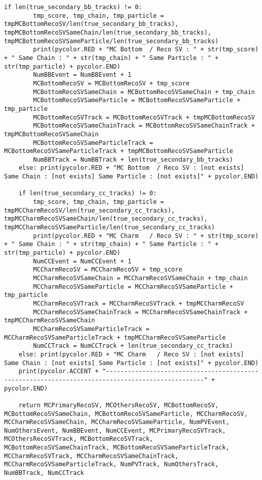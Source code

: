 \begin{lstlisting}[caption=崩壊点検出アルゴリズム用関数,label=VertexFinder1]
    if len(true_secondary_bb_tracks) != 0:
        tmp_score, tmp_chain, tmp_particle = tmpMCBottomRecoSV/len(true_secondary_bb_tracks), tmpMCBottomRecoSVSameChain/len(true_secondary_bb_tracks), tmpMCBottomRecoSVSameParticle/len(true_secondary_bb_tracks)
        print(pycolor.RED + "MC Bottom  / Reco SV : " + str(tmp_score) + " Same Chain : " + str(tmp_chain) + " Same Particle : " + str(tmp_particle) + pycolor.END)
        NumBBEvent = NumBBEvent + 1
        MCBottomRecoSV = MCBottomRecoSV + tmp_score
        MCBottomRecoSVSameChain = MCBottomRecoSVSameChain + tmp_chain
        MCBottomRecoSVSameParticle = MCBottomRecoSVSameParticle + tmp_particle
        MCBottomRecoSVTrack = MCBottomRecoSVTrack + tmpMCBottomRecoSV
        MCBottomRecoSVSameChainTrack = MCBottomRecoSVSameChainTrack + tmpMCBottomRecoSVSameChain
        MCBottomRecoSVSameParticleTrack = MCBottomRecoSVSameParticleTrack + tmpMCBottomRecoSVSameParticle
        NumBBTrack = NumBBTrack + len(true_secondary_bb_tracks)
    else: print(pycolor.RED + "MC Bottom  / Reco SV : [not exists] Same Chain : [not exists] Same Particle : [not exists]" + pycolor.END)
        
    if len(true_secondary_cc_tracks) != 0:
        tmp_score, tmp_chain, tmp_particle = tmpMCCharmRecoSV/len(true_secondary_cc_tracks), tmpMCCharmRecoSVSameChain/len(true_secondary_cc_tracks), tmpMCCharmRecoSVSameParticle/len(true_secondary_cc_tracks)
        print(pycolor.RED + "MC Charm   / Reco SV : " + str(tmp_score)  + " Same Chain : " + str(tmp_chain) + " Same Particle : " + str(tmp_particle) + pycolor.END)
        NumCCEvent = NumCCEvent + 1
        MCCharmRecoSV = MCCharmRecoSV + tmp_score
        MCCharmRecoSVSameChain = MCCharmRecoSVSameChain + tmp_chain
        MCCharmRecoSVSameParticle = MCCharmRecoSVSameParticle + tmp_particle
        MCCharmRecoSVTrack = MCCharmRecoSVTrack + tmpMCCharmRecoSV
        MCCharmRecoSVSameChainTrack = MCCharmRecoSVSameChainTrack + tmpMCCharmRecoSVSameChain
        MCCharmRecoSVSameParticleTrack = MCCharmRecoSVSameParticleTrack + tmpMCCharmRecoSVSameParticle
        NumCCTrack = NumCCTrack + len(true_secondary_cc_tracks)
    else: print(pycolor.RED + "MC Charm   / Reco SV : [not exists] Same Chain : [not exists] Same Particle : [not exists]" + pycolor.END)
    print(pycolor.ACCENT + "-------------------------------------------------------------------------------------------------" + pycolor.END)
		
    return MCPrimaryRecoSV, MCOthersRecoSV, MCBottomRecoSV, MCBottomRecoSVSameChain, MCBottomRecoSVSameParticle, MCCharmRecoSV, MCCharmRecoSVSameChain, MCCharmRecoSVSameParticle, NumPVEvent, NumOthersEvent, NumBBEvent, NumCCEvent, MCPrimaryRecoSVTrack, MCOthersRecoSVTrack, MCBottomRecoSVTrack, MCBottomRecoSVSameChainTrack, MCBottomRecoSVSameParticleTrack, MCCharmRecoSVTrack, MCCharmRecoSVSameChainTrack, MCCharmRecoSVSameParticleTrack, NumPVTrack, NumOthersTrack, NumBBTrack, NumCCTrack



\end{lstlisting}

